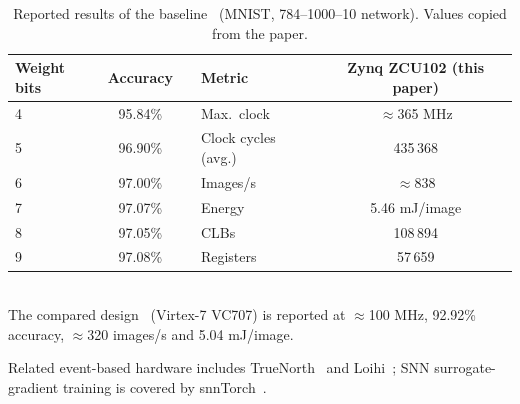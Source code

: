 \begin{table}[t]
\centering
\caption{Reported results of the baseline~\cite{windhager2024} (MNIST, 784--1000--10 network). Values copied from the paper.}
\label{tab:baseline}
\begin{tabular}{@{}lcc@{\qquad}lc@{}}
\toprule
Weight bits & Accuracy & & Metric & Zynq ZCU102 (this paper)\\
\midrule
4 & 95.84\% & & Max.\ clock & $\approx$365 MHz\\
5 & 96.90\% & & Clock cycles (avg.) & 435\,368\\
6 & 97.00\% & & Images/s & $\approx$838\\
7 & 97.07\% & & Energy & 5.46 mJ/image\\
8 & 97.05\% & & CLBs & 108\,894\\
9 & 97.08\% & & Registers & 57\,659\\
\bottomrule
\end{tabular}
\\[0.4em]
{\footnotesize The compared design~\cite{li2021fast} (Virtex-7 VC707) is reported at $\approx$100 MHz, 92.92\% accuracy, $\approx$320 images/s and 5.04 mJ/image.}
\end{table}

Related event-based hardware includes TrueNorth~\cite{akopyan2015} and Loihi~\cite{davies2021}; SNN surrogate-gradient training is covered by snnTorch~\cite{eshraghian2023}.
